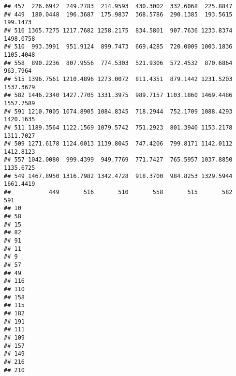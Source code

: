 \documentclass[
]{article}
\begin{document}
\begin{verbatim}
## 457  226.6942  249.2783  214.9593  430.3002  332.6068  225.8847          
## 449  180.0448  196.3687  175.9837  368.5786  290.1385  193.5615  199.1473
## 516 1365.7275 1217.7682 1258.2175  834.5801  907.7636 1233.8374 1498.0758
## 510  993.3991  951.9124  899.7473  669.4285  720.0009 1003.1836 1105.4048
## 558  890.2236  807.9556  774.5303  521.9306  572.4532  870.6864  963.7964
## 515 1396.7561 1210.4896 1273.0072  811.4351  879.1442 1231.5203 1537.3679
## 582 1446.2340 1427.7705 1331.3975  989.7157 1103.1860 1469.4486 1557.7589
## 591 1210.7005 1074.8905 1084.8345  718.2944  752.1709 1088.4293 1420.1635
## 511 1189.3564 1122.1569 1079.5742  751.2923  801.3940 1153.2178 1311.7027
## 509 1271.6178 1124.0013 1139.8045  747.4206  799.8171 1142.0112 1412.8123
## 557 1042.0080  999.4399  949.7769  771.7427  765.5957 1037.8850 1135.6725
## 549 1467.8950 1316.7982 1342.4728  918.3700  984.8253 1329.5944 1661.4419
##           449       516       510       558       515       582       591
## 10                                                                       
## 58                                                                       
## 15                                                                       
## 82                                                                       
## 91                                                                       
## 11                                                                       
## 9                                                                        
## 57                                                                       
## 49                                                                       
## 116                                                                      
## 110                                                                      
## 158                                                                      
## 115                                                                      
## 182                                                                      
## 191                                                                      
## 111                                                                      
## 109                                                                      
## 157                                                                      
## 149                                                                      
## 216                                                                      
## 210                                                                      

\end{verbatim}
\end{document}
